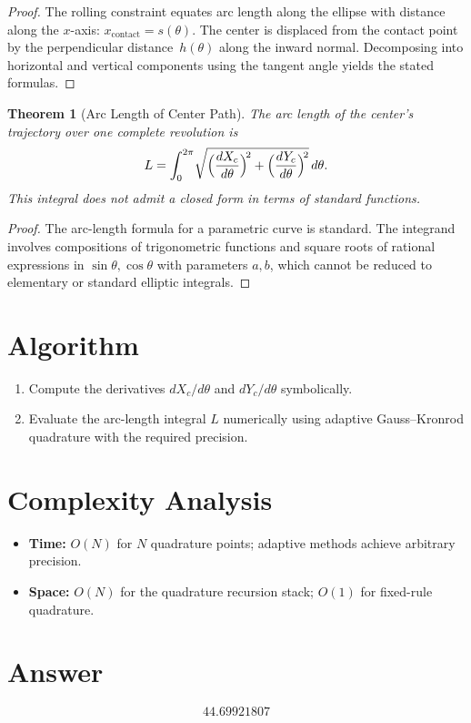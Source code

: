 \documentclass[11pt]{article}
\newtheorem{theorem}{Theorem}
\begin{document}
\begin{proof}
The rolling constraint equates arc length along the ellipse with distance along the $x$-axis: $x_{\mathrm{contact}} = s(\theta)$. The center is displaced from the contact point by the perpendicular distance~$h(\theta)$ along the inward normal. Decomposing into horizontal and vertical components using the tangent angle yields the stated formulas.
\end{proof}

\begin{theorem}[Arc Length of Center Path]
The arc length of the center's trajectory over one complete revolution is
\[
L = \int_0^{2\pi}\!\sqrt{\Bigl(\frac{dX_c}{d\theta}\Bigr)^{\!2} + \Bigl(\frac{dY_c}{d\theta}\Bigr)^{\!2}}\,d\theta.
\]
This integral does not admit a closed form in terms of standard functions.
\end{theorem}

\begin{proof}
The arc-length formula for a parametric curve is standard. The integrand involves compositions of trigonometric functions and square roots of rational expressions in $\sin\theta,\cos\theta$ with parameters $a,b$, which cannot be reduced to elementary or standard elliptic integrals.
\end{proof}

\section{Algorithm}

\begin{enumerate}
    \item Compute the derivatives $dX_c/d\theta$ and $dY_c/d\theta$ symbolically.
    \item Evaluate the arc-length integral $L$ numerically using adaptive Gauss--Kronrod quadrature with the required precision.
\end{enumerate}

\section{Complexity Analysis}
\begin{itemize}
    \item \textbf{Time:} $O(N)$ for $N$ quadrature points; adaptive methods achieve arbitrary precision.
    \item \textbf{Space:} $O(N)$ for the quadrature recursion stack; $O(1)$ for fixed-rule quadrature.
\end{itemize}

\section{Answer}

\[
\boxed{44.69921807}
\]
\end{document}
